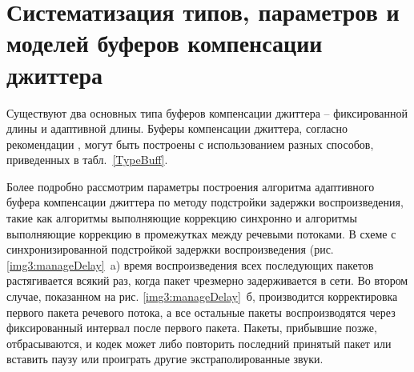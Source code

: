\section{Систематизация типов, параметров и моделей буферов компенсации джиттера} \label{sect3_3}

Существуют два основных типа буферов компенсации джиттера – фиксированной длины и адаптивной длины. Буферы компенсации джиттера, согласно рекомендации \cite{G1020}, могут быть построены с использованием разных способов, приведенных в табл. \ref{TypeBuff}.

Более подробно рассмотрим параметры построения алгоритма адаптивного буфера компенсации джиттера по методу подстройки задержки воспроизведения, такие как алгоритмы выполняющие коррекцию синхронно и алгоритмы выполняющие коррекцию в промежутках между речевыми потоками. 
В схеме с синхронизированной подстройкой задержки воспроизведения (рис. \ref{img3:manageDelay} a) время воспроизведения всех последующих пакетов растягивается всякий раз, когда пакет чрезмерно задерживается в сети. 
Во втором случае, показанном на рис. \ref{img3:manageDelay} б, производится корректировка первого пакета речевого потока, а все остальные пакеты воспроизводятся через фиксированный интервал после первого пакета. Пакеты, прибывшие позже, отбрасываются, и кодек может либо повторить последний принятый пакет или вставить паузу или проиграть другие экстраполированные звуки.


